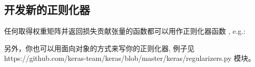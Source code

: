 \subsection{开发新的正则化器}\label{ux5f00ux53d1ux65b0ux7684ux6b63ux5219ux5316ux5668}

任何取得权重矩阵并返回损失贡献张量的函数都可以用作正则化器函数 , e.g.:

\begin{Shaded}
\begin{Highlighting}[]
   

 
      \OperatorTok{*} 

\OperatorTok{=}\NormalTok{,}
                \OperatorTok{=}
\end{Highlighting}
\end{Shaded}

另外，你也可以用面向对象的方式来写你的正则化器, 例子见 https://github.com/keras-team/keras/blob/master/keras/regularizers.py 模块。

\newpage
